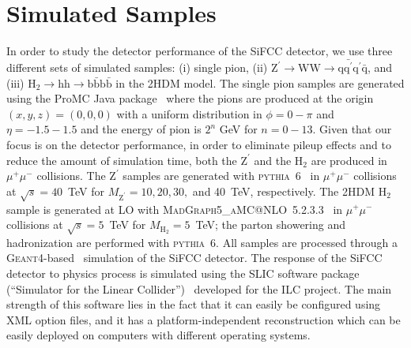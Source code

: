\documentclass{PoS}
\makeatletter
\newcommand{\PYTHIA} {{\textsc{pythia}}}
\newcommand{\GEANTfour} {{\textsc{Geant4}}}
\newcommand{\MADGRAPHAMC} {\textsc{MadGraph5\_aMC@NLO}}
\makeatother
\begin{document}
\section{Simulated Samples \label{sec:sample}}
In order to study the detector performance of the SiFCC detector, we use 
three different sets of simulated samples: (i) single pion, (ii) 
$\mathrm{Z}^{\prime}\rightarrow \mathrm{WW} \rightarrow \mathrm{q}\bar{\mathrm{q}^\prime}\mathrm{q^\prime}\bar{\mathrm{q}}$, and (iii) 
$\mathrm{H}_2\rightarrow \mathrm{hh} \rightarrow \mathrm{b}\bar{\mathrm{b}} \mathrm{b}\bar{\mathrm{b}}$ in the 2HDM model. 
% 
The single pion samples are generated using the ProMC Java 
package~\cite{PROMC} where the pions are 
produced at the origin $(x,y,z)=(0,0,0)$ with a uniform distribution 
in $\phi=0-\pi$ and $\eta = -1.5-1.5$ and the energy of pion is 
$2^n$ GeV for $n=0-13$. 
%
Given that our focus is on the detector performance, in order to eliminate 
pileup effects and to reduce the amount of simulation time, 
both the $\mathrm{Z}^{\prime}$ and the $\mathrm{H}_2$ are produced in 
$\mu^+\mu^-$ collisions. 
The $\mathrm{Z}^{\prime}$ samples are generated with 
\PYTHIA~6~\cite{PYTHIA} in $\mu^+\mu^-$ collisions at $\sqrt{s}=40$~TeV 
for $M_\mathrm{Z^\prime}=10,20,30,$ and 40~TeV, respectively. 
The 2HDM $\mathrm{H}_2$ sample is generated at LO with 
\MADGRAPHAMC~5.2.3.3~\cite{MADGRAPH} in $\mu^+\mu^-$ collisions at 
$\sqrt{s}=5$~TeV for $M_\mathrm{H_2}=5$~TeV; the parton showering and 
hadronization are performed with \PYTHIA~6. 
%
All samples are processed through a \GEANTfour-based~\cite{GEANT4} simulation 
of the SiFCC detector. The response of the SiFCC detector to physics process 
is simulated using the SLIC software package (``Simulator for the Linear 
Collider'')~\cite{SLIC} developed for the ILC project. The main strength of 
this software lies in the fact that it can easily be configured using XML 
option files, and it has a platform-independent reconstruction which can be 
easily deployed on computers with different operating systems. 
\end{document}
